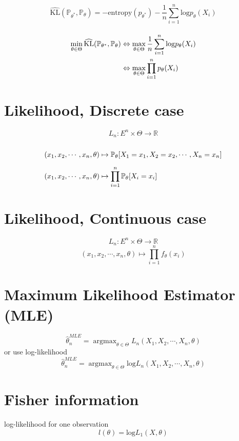 \documentclass[12pt,a4paper]{article}
\DeclareMathOperator*{\argmax}{argmax}
\begin{document}
\[
	\widehat{\mathrm{KL}}(\mathbb{P}_{\theta^*},\mathbb{P}_\theta) =  -\mathrm{entropy}(p_{\theta^*}) - \frac{1}{n}\sum_{i = 1}^{n}\mathrm{log}p_{\theta}(X_i)
\]

\[
\arraycolsep=1.4pt
\def\arraystretch{2.5}
\begin{array}{rcl}
	\min\limits_{\theta \in \Theta} \widehat{\mathrm{KL}}(\mathbb{P}_{\theta^*},\mathbb{P}_\theta)  & \Leftrightarrow & \displaystyle
	\max_{\theta \in \Theta} \frac{1}{n}\sum_{i = 1}^{n}\mathrm{log}p_{\theta}(X_i) \\
	& \Leftrightarrow & \displaystyle \max_{\theta \in \Theta} \prod_{i = 1}^{n}p_{\theta}(X_i) \\
\end{array}
\]


\section{Likelihood, Discrete case}
\[
L_n : E^n \times \Theta \rightarrow \mathbb{R}
\]
\[
\arraycolsep=1.4pt
\def\arraystretch{2.5}
\begin{array}{ccl}
	(x_1,x_2,\cdots,x_n,\theta) & \mapsto & \mathbb{P}_{\theta}[X_1 = x_1, X_2 = x_2, \cdots, X_n = x_n] \\
	(x_1,x_2,\cdots,x_n,\theta) & \mapsto & \displaystyle \prod_{i=1}^{n}\mathbb{P}_{\theta}[X_i = x_i] \\
\end{array}
\]

\section{Likelihood, Continuous case}
\[
L_n : E^n \times \Theta \rightarrow \mathbb{R}
\]
\[
	(x_1,x_2,\cdots,x_n,\theta) \mapsto \prod_{i=1}^{n}f_{\theta}(x_i)
\]

\section{Maximum Likelihood Estimator (MLE)}
\[
	\hat{\theta}_{n}^{MLE} = \argmax_{\theta \in \Theta} L_n(X_1,X_2,\cdots,X_n,\theta)
\]
or use log-likelihood
\[
	\hat{\theta}_{n}^{MLE} = \argmax_{\theta \in \Theta} \mathrm{log}L_n(X_1,X_2,\cdots,X_n,\theta)
\]

\section{Fisher information}

\hspace{\parindent}log-likelihood for one observation
\[
	l(\theta) = \mathrm{log}L_1(X,\theta)
\]
\end{document}
